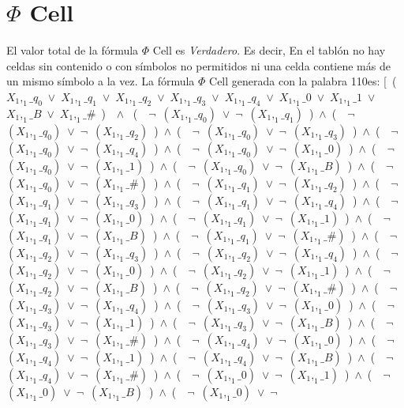 ﻿\documentclass[a4paper,10pt]{article}
\begin{document}
\section{$\Phi$ Cell}
El valor total de la fórmula $\Phi$ Cell es \emph{Verdadero}. Es decir, En el tablón no hay celdas sin contenido o con símbolos no permitidos ni una celda contiene más de un mismo símbolo a la vez. \newline \newline 
La fórmula $\Phi$ Cell generada con la palabra 110es: \newline \newline 
[\ (\ $X_1,_1\_q_0$\ $\vee$\ $X_1,_1\_q_1$\ $\vee$\ $X_1,_1\_q_2$\ $\vee$\ $X_1,_1\_q_3$\ $\vee$\ $X_1,_1\_q_4$\ $\vee$\ $X_1,_1\_0$\ $\vee$\ $X_1,_1\_1$\ $\vee$\ $X_1,_1\_B$\ $\vee$\ $X_1,_1\_\#$\ )\ \ $\wedge$ \ (\ \ $\neg$\ $(X_1,_1\_q_0)$\ $\vee$\ $\neg$\ $(X_1,_1\_q_1)$\ )\ $\wedge$\ (\ \ $\neg$\ $(X_1,_1\_q_0)$\ $\vee$\ $\neg$\ $(X_1,_1\_q_2)$\ )\ $\wedge$\ (\ \ $\neg$\ $(X_1,_1\_q_0)$\ $\vee$\ $\neg$\ $(X_1,_1\_q_3)$\ )\ $\wedge$\ (\ \ $\neg$\ $(X_1,_1\_q_0)$\ $\vee$\ $\neg$\ $(X_1,_1\_q_4)$\ )\ $\wedge$\ (\ \ $\neg$\ $(X_1,_1\_q_0)$\ $\vee$\ $\neg$\ $(X_1,_1\_0)$\ )\ $\wedge$\ (\ \ $\neg$\ $(X_1,_1\_q_0)$\ $\vee$\ $\neg$\ $(X_1,_1\_1)$\ )\ $\wedge$\ (\ \ $\neg$\ $(X_1,_1\_q_0)$\ $\vee$\ $\neg$\ $(X_1,_1\_B)$\ )\ $\wedge$\ (\ \ $\neg$\ $(X_1,_1\_q_0)$\ $\vee$\ $\neg$\ $(X_1,_1\_\#)$\ )\ $\wedge$\ (\ \ $\neg$\ $(X_1,_1\_q_1)$\ $\vee$\ $\neg$\ $(X_1,_1\_q_2)$\ )\ $\wedge$\ (\ \ $\neg$\ $(X_1,_1\_q_1)$\ $\vee$\ $\neg$\ $(X_1,_1\_q_3)$\ )\ $\wedge$\ (\ \ $\neg$\ $(X_1,_1\_q_1)$\ $\vee$\ $\neg$\ $(X_1,_1\_q_4)$\ )\ $\wedge$\ (\ \ $\neg$\ $(X_1,_1\_q_1)$\ $\vee$\ $\neg$\ $(X_1,_1\_0)$\ )\ $\wedge$\ (\ \ $\neg$\ $(X_1,_1\_q_1)$\ $\vee$\ $\neg$\ $(X_1,_1\_1)$\ )\ $\wedge$\ (\ \ $\neg$\ $(X_1,_1\_q_1)$\ $\vee$\ $\neg$\ $(X_1,_1\_B)$\ )\ $\wedge$\ (\ \ $\neg$\ $(X_1,_1\_q_1)$\ $\vee$\ $\neg$\ $(X_1,_1\_\#)$\ )\ $\wedge$\ (\ \ $\neg$\ $(X_1,_1\_q_2)$\ $\vee$\ $\neg$\ $(X_1,_1\_q_3)$\ )\ $\wedge$\ (\ \ $\neg$\ $(X_1,_1\_q_2)$\ $\vee$\ $\neg$\ $(X_1,_1\_q_4)$\ )\ $\wedge$\ (\ \ $\neg$\ $(X_1,_1\_q_2)$\ $\vee$\ $\neg$\ $(X_1,_1\_0)$\ )\ $\wedge$\ (\ \ $\neg$\ $(X_1,_1\_q_2)$\ $\vee$\ $\neg$\ $(X_1,_1\_1)$\ )\ $\wedge$\ (\ \ $\neg$\ $(X_1,_1\_q_2)$\ $\vee$\ $\neg$\ $(X_1,_1\_B)$\ )\ $\wedge$\ (\ \ $\neg$\ $(X_1,_1\_q_2)$\ $\vee$\ $\neg$\ $(X_1,_1\_\#)$\ )\ $\wedge$\ (\ \ $\neg$\ $(X_1,_1\_q_3)$\ $\vee$\ $\neg$\ $(X_1,_1\_q_4)$\ )\ $\wedge$\ (\ \ $\neg$\ $(X_1,_1\_q_3)$\ $\vee$\ $\neg$\ $(X_1,_1\_0)$\ )\ $\wedge$\ (\ \ $\neg$\ $(X_1,_1\_q_3)$\ $\vee$\ $\neg$\ $(X_1,_1\_1)$\ )\ $\wedge$\ (\ \ $\neg$\ $(X_1,_1\_q_3)$\ $\vee$\ $\neg$\ $(X_1,_1\_B)$\ )\ $\wedge$\ (\ \ $\neg$\ $(X_1,_1\_q_3)$\ $\vee$\ $\neg$\ $(X_1,_1\_\#)$\ )\ $\wedge$\ (\ \ $\neg$\ $(X_1,_1\_q_4)$\ $\vee$\ $\neg$\ $(X_1,_1\_0)$\ )\ $\wedge$\ (\ \ $\neg$\ $(X_1,_1\_q_4)$\ $\vee$\ $\neg$\ $(X_1,_1\_1)$\ )\ $\wedge$\ (\ \ $\neg$\ $(X_1,_1\_q_4)$\ $\vee$\ $\neg$\ $(X_1,_1\_B)$\ )\ $\wedge$\ (\ \ $\neg$\ $(X_1,_1\_q_4)$\ $\vee$\ $\neg$\ $(X_1,_1\_\#)$\ )\ $\wedge$\ (\ \ $\neg$\ $(X_1,_1\_0)$\ $\vee$\ $\neg$\ $(X_1,_1\_1)$\ )\ $\wedge$\ (\ \ $\neg$\ $(X_1,_1\_0)$\ $\vee$\ $\neg$\ $(X_1,_1\_B)$\ )\ $\wedge$\ (\ \ $\neg$\ $(X_1,_1\_0)$\ $\vee$\ $\neg$\ 
\end{document}
